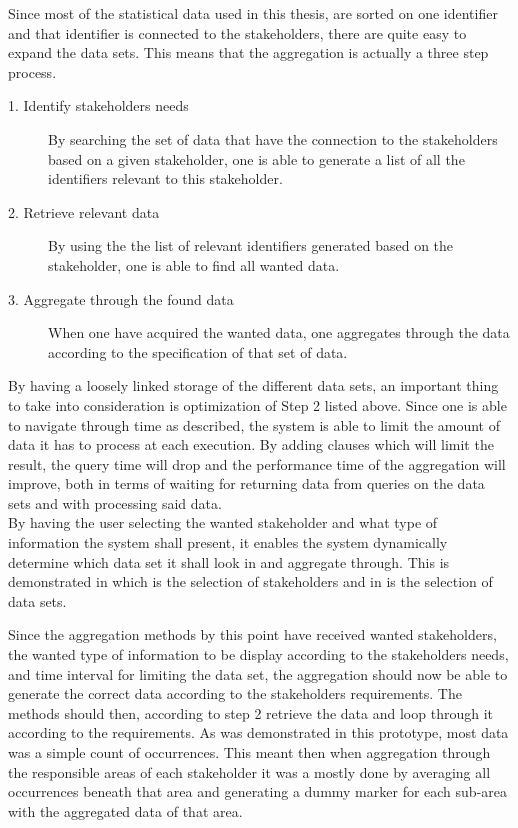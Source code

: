 Since most of the statistical data used in this thesis, are sorted on one 
identifier and that identifier is connected to the stakeholders, there are 
quite easy to expand the data sets. This means that the aggregation is actually
a three step process.

\begin{description}
	\item [1. Identify stakeholders needs] By searching the set of data that 
	have the connection to the stakeholders based on a given stakeholder, one 
	is able to generate a list of all the identifiers relevant to this 
	stakeholder.
	\item [2. Retrieve relevant data] By using the the list of relevant
	identifiers generated based on the stakeholder, one is able to find all 
	wanted data.
	\item [3. Aggregate through the found data] When one have acquired the 
	wanted data, one aggregates through the data according to the 
	specification of that set of data.
\end{description}


By having a loosely linked storage of the different data sets, an important
thing to take into consideration is optimization of Step 2 listed above. Since
one is able to navigate through time as described, the system is able to limit
the amount of data it has to process at each execution. By adding clauses which
will limit the result, the query time will drop and the performance time of the
aggregation will improve, both in terms of waiting for returning data from
queries on the data sets and with processing said data.\\

By having the user selecting the wanted stakeholder and what type of
information the system shall present, it enables the system dynamically
determine which data set it shall look in and aggregate through. This is
demonstrated in  which is the
selection of stakeholders and in  is 
the selection of data sets.

Since the aggregation methods by this point have received wanted stakeholders,
the wanted type of information to be display according to the stakeholders
needs, and time interval for limiting the data set, the aggregation should now
be able to generate the correct data according to the stakeholders
requirements. The methods should then, according to step 2 retrieve the data
and loop through it according to the requirements. As was demonstrated in this 
prototype, most data was a simple count of occurrences. This meant then when
aggregation through the responsible areas of each stakeholder it was a mostly
done by averaging all occurrences beneath that area and generating a dummy
marker for each sub-area with the aggregated data of that area.


